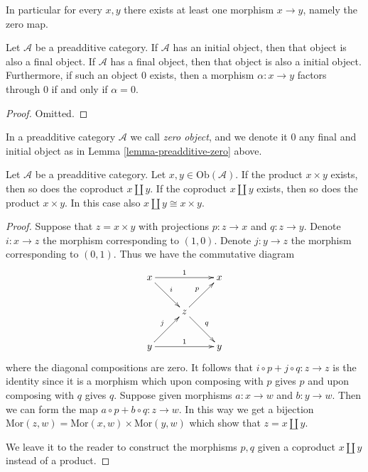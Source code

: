 \noindent
In particular for every $x, y$ there exists at least
one morphism $x \to y$, namely the zero map.

\begin{lemma}
\label{lemma-preadditive-zero}
Let $\mathcal{A}$ be a preadditive category.
If $\mathcal{A}$ has an initial object, then that object
is also a final object. If $\mathcal{A}$ has a final object, then that object
is also a initial object. Furthermore, if such an object $0$ exists,
then a morphism $\alpha : x \to y$ factors through $0$ if and only if
$\alpha = 0$.
\end{lemma}

\begin{proof}
Omitted.
\end{proof}

\begin{definition}
\label{definition-zero-object}
In a preadditive category $\mathcal{A}$ we call
{\it zero object}, and we denote it $0$
any final and initial object as in Lemma \ref{lemma-preadditive-zero} above.
\end{definition}

\begin{lemma}
\label{lemma-preadditive-direct-sum}
Let $\mathcal{A}$ be a preadditive category.
Let $x, y \in \text{Ob}(\mathcal{A})$.
If the product $x \times y$ exists, then so does
the coproduct $x \coprod y$.
If the coproduct $x \coprod y$ exists, then so does
the product $x \times y$. In this case
also $x \coprod y \cong x \times y$.
\end{lemma}

\begin{proof}
Suppose that $z = x \times y$ with projections
$p : z \to x$ and $q : z \to y$. Denote $i : x \to z$
the morphism corresponding to $(1, 0)$. Denote $j : y \to z$
the morphism corresponding to $(0, 1)$. Thus we have the
commutative diagram
$$
\xymatrix{
x \ar[rr]^1 \ar[rd]^i & & x \\
& z \ar[ru]^p \ar[rd]^q & \\
y \ar[rr]^1 \ar[ru]^j & & y
}
$$
where the diagonal compositions are zero. It follows that
$i \circ p + j \circ q : z \to z$ is the identity since
it is a morphism which upon composing with $p$ gives $p$
and upon composing with $q$ gives $q$.
Suppose given morphisms $a : x \to w$ and $b : y \to w$.
Then we can form the map $a \circ p + b \circ q : z \to w$.
In this way we get a bijection $\text{Mor}(z, w)
= \text{Mor}(x, w) \times \text{Mor}(y, w)$ which
show that $z = x \coprod y$.

\medskip\noindent
We leave it to the reader to construct the morphisms
$p, q$ given a coproduct $x \coprod y$ instead of a
product.
\end{proof}

